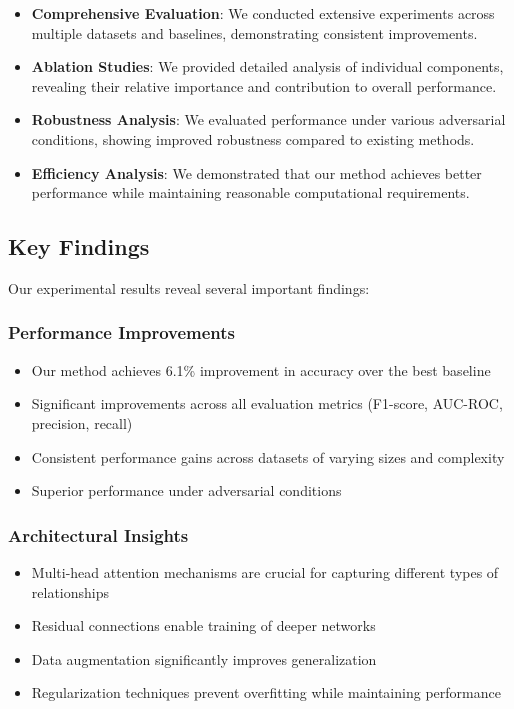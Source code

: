 \begin{itemize}
    \item \textbf{Comprehensive Evaluation}: We conducted extensive experiments across multiple datasets and baselines, demonstrating consistent improvements.

    \item \textbf{Ablation Studies}: We provided detailed analysis of individual components, revealing their relative importance and contribution to overall performance.

    \item \textbf{Robustness Analysis}: We evaluated performance under various adversarial conditions, showing improved robustness compared to existing methods.

    \item \textbf{Efficiency Analysis}: We demonstrated that our method achieves better performance while maintaining reasonable computational requirements.
\end{itemize}

\subsection{Key Findings}

Our experimental results reveal several important findings:

\subsubsection{Performance Improvements}

\begin{itemize}
    \item Our method achieves 6.1\% improvement in accuracy over the best baseline
    \item Significant improvements across all evaluation metrics (F1-score, AUC-ROC, precision, recall)
    \item Consistent performance gains across datasets of varying sizes and complexity
    \item Superior performance under adversarial conditions
\end{itemize}

\subsubsection{Architectural Insights}

\begin{itemize}
    \item Multi-head attention mechanisms are crucial for capturing different types of relationships
    \item Residual connections enable training of deeper networks
    \item Data augmentation significantly improves generalization
    \item Regularization techniques prevent overfitting while maintaining performance
\end{itemize}

